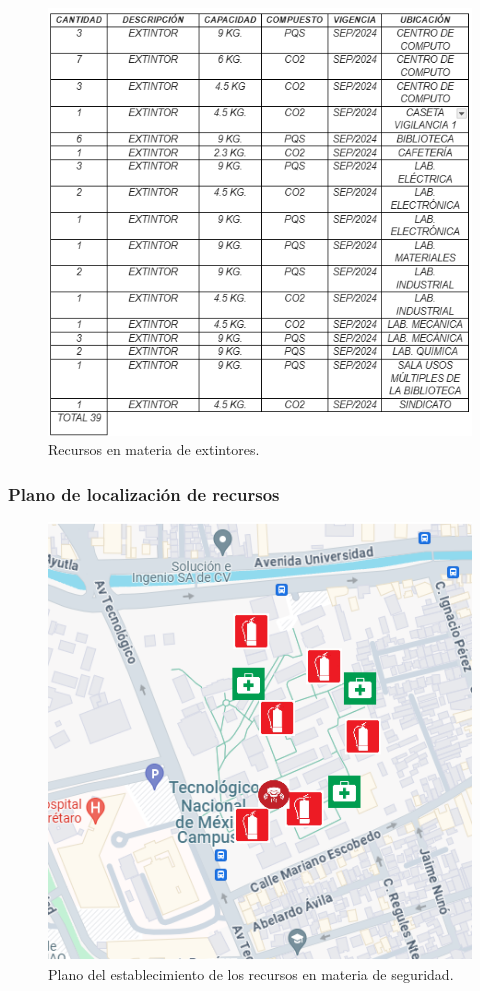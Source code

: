     \begin{figure}[H]
        \centering
        \includegraphics[scale=0.5]{35/Img/extintores.png}
        \caption{Recursos en materia de extintores.}
    \end{figure}
    
    \subsubsection{Plano de localización de recursos}
    \begin{figure}[H]
        \centering
        \includegraphics[scale=0.45]{35/Img/mapaEB.png}
        \caption{Plano del establecimiento de los recursos en materia de seguridad.}
    \end{figure}
    
